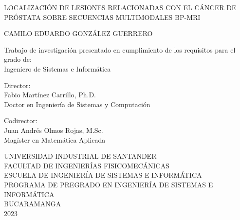 \begin{center}

LOCALIZACIÓN DE LESIONES RELACIONADAS CON EL CÁNCER DE PRÓSTATA SOBRE SECUENCIAS MULTIMODALES BP-MRI\vspace{2cm}

CAMILO EDUARDO GONZÁLEZ GUERRERO\\
\vspace{1.5cm}

Trabajo de investigación presentado en cumplimiento de los requisitos para el grado de:\\
Ingeniero de Sistemas e Informática\\\vspace{1.5cm}

Director:\\
Fabio Martínez Carrillo, Ph.D.\\
Doctor en Ingeniería de Sistemas y Computación \vspace{1cm}

Codirector:\\
Juan Andrés Olmos Rojas, M.Sc.\\
Magíster en Matemática Aplicada \vspace{2cm}


UNIVERSIDAD INDUSTRIAL DE SANTANDER\\
FACULTAD DE INGENIERÍAS FISICOMECÁNICAS\\
ESCUELA DE INGENIERÍA DE SISTEMAS E INFORMÁTICA\\
PROGRAMA DE PREGRADO EN INGENIERÍA DE SISTEMAS E INFORMÁTICA\\
BUCARAMANGA\\
2023\\


\end{center}


